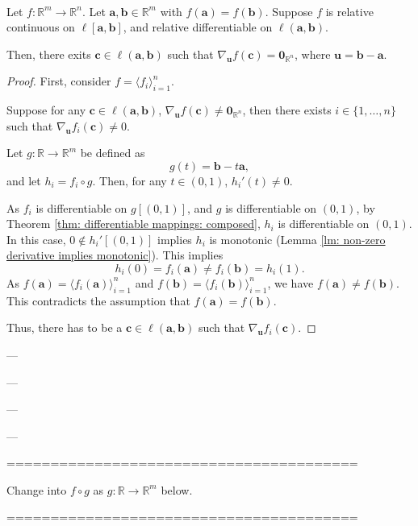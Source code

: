 \begin{lemma}
	 \
	
	Let $f: \mathbb R^m \to \mathbb R^n$. Let $\mathbf a, \mathbf b \in \mathbb R^m$ with $f(\mathbf a) = f(\mathbf b)$. Suppose $f$ is relative continuous on $\ell[\mathbf a, \mathbf b]$, and relative differentiable on $\ell(\mathbf a, \mathbf b)$. 
	
	Then, there exits $\mathbf c \in \ell(\mathbf a, \mathbf b)$ such that $\nabla_{\mathbf u} f(\mathbf c) = \mathbf 0_{\mathbb R^n}$, where $\mathbf u = \mathbf b - \mathbf a$.
	
	\begin{proof}
		First, consider $f = \langle f_i \rangle_{i = 1}^n$.
		
		Suppose for any $\mathbf c \in \ell(\mathbf a, \mathbf b)$, $\nabla_{\mathbf u} f(\mathbf c) \ne \mathbf 0_{\mathbb R^n}$, then there exists $i \in \{1, \ldots, n\}$ such that $\nabla_{\mathbf u}f_i(\mathbf c) \ne 0$.
		
		Let $g: \mathbb R \to \mathbb R^m$ be defined as
		$$
		g(t) = \mathbf b - t\mathbf a,
		$$
		and let $h_i = f_i \circ g$. Then, for any $t \in (0, 1)$, $h_i'(t) \ne 0$.
		
		As $f_i$ is differentiable on $g[(0,1)]$, and $g$ is differentiable on $(0,1)$, by Theorem \ref{thm: differentiable mappings: composed}, $h_i$ is differentiable on $(0,1)$. In this case, $0 \notin h_i'[(0,1)]$ implies $h_i$ is monotonic (Lemma \ref{lm: non-zero derivative implies monotonic}). This implies
		$$
		h_i(0) = f_i(\mathbf a) \ne f_i(\mathbf b) = h_i(1).
		$$
		As $f(\mathbf a) = \langle f_i(\mathbf a) \rangle_{i = 1}^n$ and $f(\mathbf b) = \langle f_i(\mathbf b) \rangle_{i = 1}^n$, we have $f(\mathbf a) \ne f(\mathbf b)$. This contradicts the assumption that $f(\mathbf a) = f(\mathbf b)$.
		
		Thus, there has to be a $\mathbf c \in \ell(\mathbf a, \mathbf b)$ such that $\nabla_{\mathbf u} f_i(\mathbf c)$.
	\end{proof}
\end{lemma}


---

---

---

---

========================================

Change into $f \circ g$ as $g: \mathbb R \to \mathbb R^m$ below.


========================================



